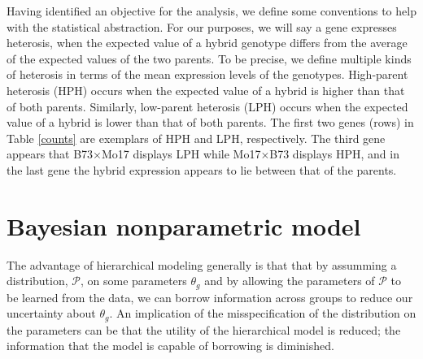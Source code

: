 
Having identified an objective for the analysis, we define some conventions to help with the statistical abstraction. For our purposes, we will say a gene expresses heterosis, when the expected value of a hybrid genotype differs from the average of the expected values of the two parents. To be precise, we define multiple kinds of heterosis in terms of the mean expression levels of the genotypes. High-parent heterosis (HPH) occurs when the expected value of a hybrid is higher than that of both parents. Similarly, low-parent heterosis (LPH) occurs when the expected value of a hybrid is lower than that of both parents. The first two genes (rows) in Table \ref{counts} are exemplars of HPH and LPH, respectively. The third gene appears that B73$\times$Mo17 displays LPH while Mo17$\times$B73 displays HPH, and in the last gene the hybrid expression appears to lie between that of the parents.

\section{Bayesian nonparametric model}
The advantage of hierarchical modeling generally is that that by assumming a distribution, $\mathcal{P}$, on some parameters $\theta_g$ and by allowing the parameters of $\mathcal{P}$ to be learned from the data, we can borrow information across groups to reduce our uncertainty about $\theta_g$. An implication of the misspecification of the distribution on the parameters can be that the utility of the hierarchical model is reduced; the information that the model is capable of borrowing is diminished.


